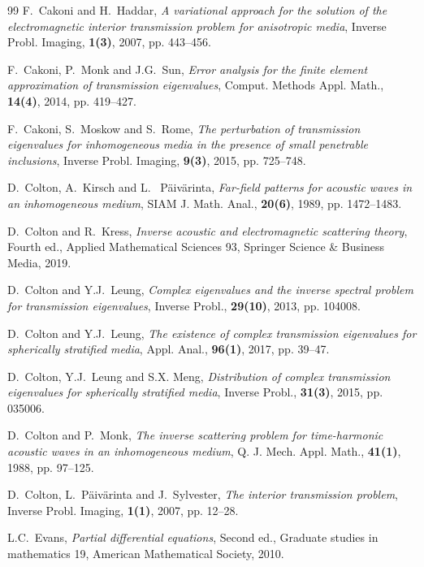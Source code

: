 \documentclass[11pt,reqno]{amsart}
\theoremstyle{definition}
\theoremstyle{remark}
\numberwithin{equation}{section}
\begin{document}
\begin{thebibliography}{99}
	{F.~Cakoni and H.~Haddar},
	{\it A variational approach for the solution of the electromagnetic interior transmission problem for anisotropic media},
	Inverse Probl. Imaging, \textbf{1(3)}, 2007, pp. 443--456.
	
	{F.~Cakoni, P.~Monk and J.G.~Sun},
	{\it Error analysis for the finite element approximation of transmission eigenvalues},
	Comput. Methods Appl. Math., \textbf{14(4)}, 2014, pp. 419--427.
	
	{F.~Cakoni, S.~Moskow and S.~Rome},
	{\it The perturbation of transmission eigenvalues for inhomogeneous media in the presence of small penetrable inclusions},
	Inverse Probl. Imaging, \textbf{9(3)}, 2015, pp. 725--748.
	
	{D.~Colton, A.~Kirsch and L.~ P\"aiv\"arinta},
	{\it Far-field patterns for acoustic waves in an inhomogeneous medium},
	SIAM J. Math. Anal., \textbf{20(6)}, 1989, pp. 1472--1483.
	
	{D.~Colton and R.~Kress},
	{\it Inverse acoustic and electromagnetic scattering theory},
	Fourth ed., Applied Mathematical Sciences 93, Springer Science \& Business Media, 2019.
	
	{D.~Colton and Y.J.~Leung},
	{\it Complex eigenvalues and the inverse spectral problem for transmission eigenvalues},
	Inverse Probl., \textbf{29(10)}, 2013, pp. 104008.
	
	{D.~Colton and Y.J.~Leung},
	{\it The existence of complex transmission eigenvalues for spherically stratified media},
	Appl. Anal., \textbf{96(1)}, 2017, pp. 39--47.
	
    {D.~Colton, Y.J.~Leung and S.X. Meng},
    {\it Distribution of complex transmission eigenvalues for spherically stratified media},
    Inverse Probl., \textbf{31(3)}, 2015, pp. 035006.
	
	{D.~Colton and P.~Monk},
	{\it The inverse scattering problem for time-harmonic acoustic waves in an inhomogeneous medium},	
	Q. J. Mech. Appl. Math., \textbf{41(1)}, 1988, pp. 97--125.
	
	{D.~Colton, L.~P\"aiv\"arinta and J.~Sylvester},
	{\it The interior transmission problem},
	Inverse Probl. Imaging, \textbf{1(1)}, 2007, pp. 12--28.
	
	{L.C.~Evans},
	{\it Partial differential equations},
	Second ed., Graduate studies in mathematics 19, American Mathematical Society, 2010.
		

\end{thebibliography}
\end{document}
